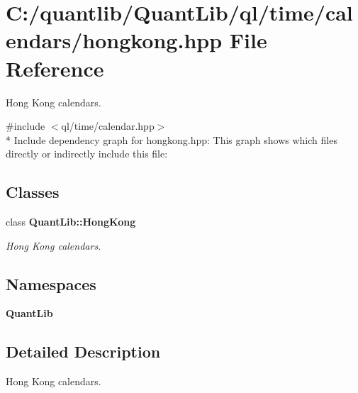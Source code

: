 \section{C\+:/quantlib/\+Quant\+Lib/ql/time/calendars/hongkong.hpp File Reference}
\label{hongkong_8hpp}


Hong Kong calendars.  


{\ttfamily \#include $<$ql/time/calendar.\+hpp$>$}\\*
Include dependency graph for hongkong.\+hpp\+:
This graph shows which files directly or indirectly include this file\+:
\subsection*{Classes}
\begin{DoxyCompactItemize}
\item 
class {\bf Quant\+Lib\+::\+Hong\+Kong}
\begin{DoxyCompactList}\small\item\em Hong Kong calendars. \end{DoxyCompactList}\end{DoxyCompactItemize}
\subsection*{Namespaces}
\begin{DoxyCompactItemize}
\item 
 {\bf Quant\+Lib}
\end{DoxyCompactItemize}


\subsection{Detailed Description}
Hong Kong calendars. 

